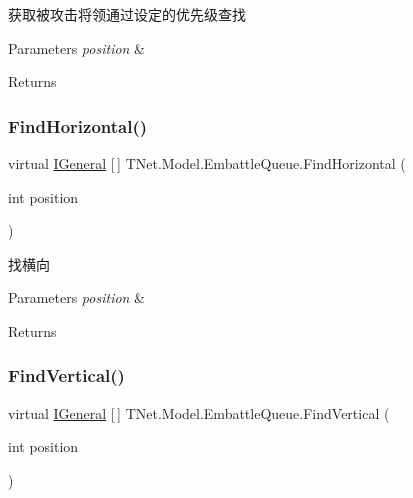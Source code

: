 获取被攻击将领通过设定的优先级查找 


\begin{DoxyParams}{Parameters}
{\em position} & \\
\hline
\end{DoxyParams}
\begin{DoxyReturn}{Returns}

\end{DoxyReturn}
\mbox{\label{class_t_net_1_1_model_1_1_embattle_queue_ad4f666319179cad16ce6abcfb59bd646}} 
\subsubsection{\texorpdfstring{Find\+Horizontal()}{FindHorizontal()}}
{\footnotesize\ttfamily virtual \mbox{\hyperlink{interface_t_net_1_1_model_1_1_i_general}{I\+General}} \mbox{[}$\,$\mbox{]} T\+Net.\+Model.\+Embattle\+Queue.\+Find\+Horizontal (\begin{DoxyParamCaption}\item[{int}]{position }\end{DoxyParamCaption})\hspace{0.3cm}{\ttfamily [virtual]}}



找横向 


\begin{DoxyParams}{Parameters}
{\em position} & \\
\hline
\end{DoxyParams}
\begin{DoxyReturn}{Returns}

\end{DoxyReturn}
\mbox{\label{class_t_net_1_1_model_1_1_embattle_queue_a9fe4efc081860df81e6bc760fe7cec43}} 
\subsubsection{\texorpdfstring{Find\+Vertical()}{FindVertical()}}
{\footnotesize\ttfamily virtual \mbox{\hyperlink{interface_t_net_1_1_model_1_1_i_general}{I\+General}} \mbox{[}$\,$\mbox{]} T\+Net.\+Model.\+Embattle\+Queue.\+Find\+Vertical (\begin{DoxyParamCaption}\item[{int}]{position }\end{DoxyParamCaption})\hspace{0.3cm}{\ttfamily [virtual]}}



